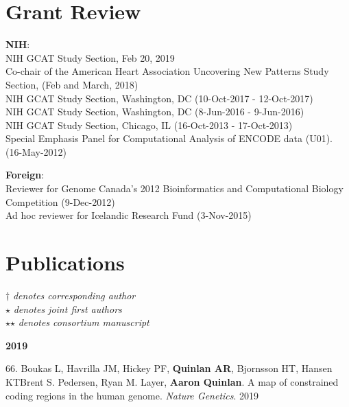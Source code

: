 \documentclass[margin,line]{cv}
\begin{document}
\begin{resume}
    \section{\mysidestyle Grant Review}
    \textbf{NIH}:\\
    NIH GCAT Study Section, Feb 20, 2019\\
    Co-chair of the American Heart Association Uncovering New Patterns Study Section, (Feb and March, 2018)\\
    NIH GCAT Study Section, Washington, DC (10-Oct-2017 - 12-Oct-2017)\\
    NIH GCAT Study Section, Washington, DC (8-Jun-2016 - 9-Jun-2016)\\
    NIH GCAT Study Section, Chicago, IL (16-Oct-2013 - 17-Oct-2013)\\
    Special Emphasis Panel for Computational Analysis of ENCODE data (U01). (16-May-2012)

    \textbf{Foreign}:\\
    Reviewer for Genome Canada's 2012 Bioinformatics and Computational Biology Competition (9-Dec-2012)\\
    Ad hoc reviewer for Icelandic Research Fund (3-Nov-2015)
    \section{\mysidestyle Publications}
    $\dagger$\textit{ denotes corresponding author}\\
    $\star$\textit{ denotes joint first authors}\\
    $\star$$\star$\textit{ denotes consortium manuscript}

    \textbf{2019} \\

    \begin{list}{*}{}

    \item[66.] Boukas L, Havrilla JM, Hickey PF, \textbf{Quinlan AR}, Bjornsson HT, Hansen KTBrent S. Pedersen, Ryan M. Layer, \textbf{Aaron Quinlan}. A map of constrained coding regions in the human genome. \emph{Nature Genetics}. 2019

  
    \end{list}


\end{resume}
\end{document}
